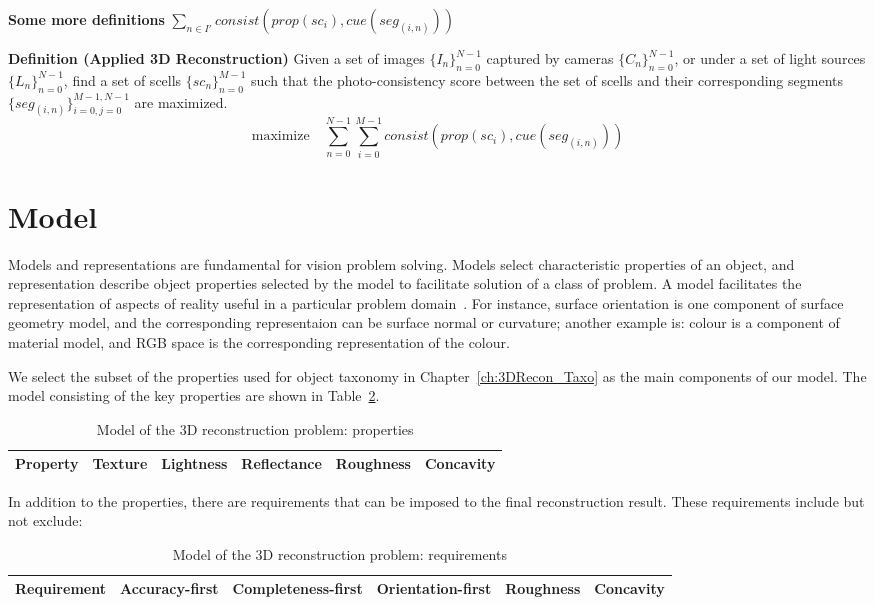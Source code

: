 \textbf{Some more definitions} $\sum_{n\in I'}consist(prop(sc_i), cue(seg_{(i, n)}))$

\textbf{Definition (Applied 3D Reconstruction)} Given a set of images $\{I_n\}_{n=0}^{N-1}$ captured by cameras $\{C_n\}_{n=0}^{N-1}$, or under a set of light sources $\{L_n\}_{n=0}^{N-1}$, find a set of scells $\{sc_n\}_{n=0}^{M-1}$ such that the photo-consistency score between the set of scells and their corresponding segments $\{seg_{(i, n)}\}_{i=0,j=0}^{M-1,N-1}$ are maximized.
$$
\mbox{maximize} \quad \sum_{n=0}^{N-1}\sum_{i=0}^{M-1} consist(prop(sc_i), cue(seg_{(i, n)}))
$$

\section{Model}
\label{sec:3DRecon_Model}
Models and representations are fundamental for vision problem solving. Models select characteristic properties of an object, and representation describe object properties selected by the model to facilitate solution of a class of problem. A model facilitates the representation of aspects of reality useful in a particular problem domain~\cite{bolles19863dpo}. For instance, surface orientation is one component of surface geometry model, and the corresponding representaion can be surface normal or curvature; another example is: colour is a component of material model, and RGB space is the corresponding representation of the colour.

We select the subset of the properties used for object taxonomy in Chapter~\ref{ch:3DRecon_Taxo} as the main components of our model. The model consisting of the key properties are shown in Table~\ref{tab:3DRecon_model}.
\begin{table}[h]
  \centering
  \begin{tabular}{l|*{5}{c}}
  \hline
  \textbf{Property} & Texture & Lightness & Reflectance & Roughness & Concavity\\
  \hline
  \end{tabular}
  \caption{Model of the 3D reconstruction problem: properties}
  \label{tab:3DRecon_model}
\end{table}

In addition to the properties, there are requirements that can be imposed to the final reconstruction result. These requirements include but not exclude:

\begin{table}[h]
  \centering
  \begin{tabular}{l|*{5}{c}}
  \hline
  \textbf{Requirement} & Accuracy-first & Completeness-first & Orientation-first & Roughness & Concavity\\
  \hline
  \end{tabular}
  \caption{Model of the 3D reconstruction problem: requirements}
  \label{tab:3DRecon_model}
\end{table}

